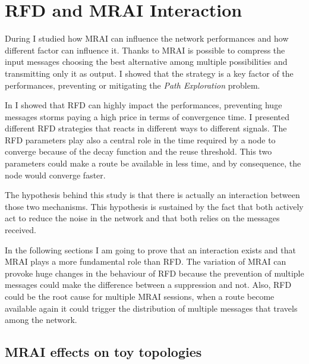 \chapter{RFD and MRAI Interaction}
\label{cha:bgp_rfd_vs_mrai}


During  I studied how \ac{MRAI} can influence
the network performances and how different factor can influence it.
Thanks to \ac{MRAI} is possible to compress the input messages choosing the best
alternative among multiple possibilities and transmitting only it as output.
I showed that the strategy is a key factor of the performances, preventing or
mitigating the \textit{Path Exploration} problem.

In  I showed that \ac{RFD} can highly impact the performances,
preventing huge messages storms paying a high price in terms of convergence time.
I presented different \ac{RFD} strategies that reacts in different ways to
different signals.
The \ac{RFD} parameters play also a central role in the time required by a node
to converge because of the decay function and the reuse threshold.
This two parameters could make a route be available in less time, and by consequence,
the node would converge faster.

The hypothesis behind this study is that there is actually an interaction between
those two mechanisms.
This hypothesis is sustained by the fact that both actively act to reduce the
noise in the network and that both relies on the messages received.

In the following sections I am going to prove that an interaction exists and that \ac{MRAI}
plays a more fundamental role than \ac{RFD}.
The variation of \ac{MRAI} can provoke huge changes in the behaviour of \ac{RFD}
because the prevention of multiple messages could make the difference between
a suppression and not.
Also, \ac{RFD} could be the root cause for multiple \ac{MRAI} sessions, when
a route become available again it could trigger the distribution of multiple
messages that travels among the network.

\section{MRAI effects on toy topologies}
\label{sec:bgp_rfd_toy}

%

